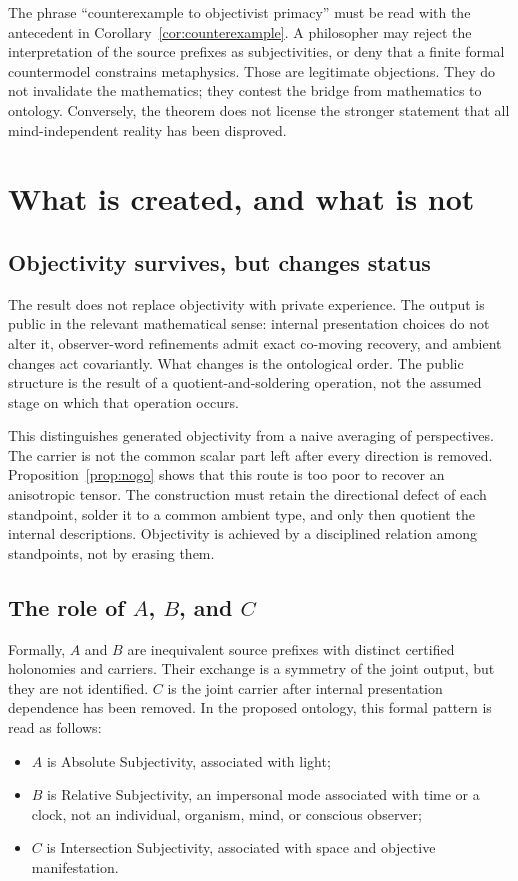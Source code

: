 \documentclass[11pt]{article}
\theoremstyle{definition}
\theoremstyle{remark}
\begin{document}
The phrase ``counterexample to objectivist primacy'' must be read with the antecedent in Corollary~\ref{cor:counterexample}. A philosopher may reject the interpretation of the source prefixes as subjectivities, or deny that a finite formal countermodel constrains metaphysics. Those are legitimate objections. They do not invalidate the mathematics; they contest the bridge from mathematics to ontology. Conversely, the theorem does not license the stronger statement that all mind-independent reality has been disproved.

\section{What is created, and what is not}

\subsection{Objectivity survives, but changes status}

The result does not replace objectivity with private experience. The output is public in the relevant mathematical sense: internal presentation choices do not alter it, observer-word refinements admit exact co-moving recovery, and ambient changes act covariantly. What changes is the ontological order. The public structure is the result of a quotient-and-soldering operation, not the assumed stage on which that operation occurs.

This distinguishes generated objectivity from a naive averaging of perspectives. The carrier is not the common scalar part left after every direction is removed. Proposition~\ref{prop:nogo} shows that this route is too poor to recover an anisotropic tensor. The construction must retain the directional defect of each standpoint, solder it to a common ambient type, and only then quotient the internal descriptions. Objectivity is achieved by a disciplined relation among standpoints, not by erasing them.

\subsection{The role of \texorpdfstring{$A$, $B$, and $C$}{A, B, and C}}

Formally, $A$ and $B$ are inequivalent source prefixes with distinct certified holonomies and carriers. Their exchange is a symmetry of the joint output, but they are not identified. $C$ is the joint carrier after internal presentation dependence has been removed. In the proposed ontology, this formal pattern is read as follows:
\begin{itemize}
\item $A$ is Absolute Subjectivity, associated with light;
\item $B$ is Relative Subjectivity, an impersonal mode associated with time or a clock, not an individual, organism, mind, or conscious observer;
\item $C$ is Intersection Subjectivity, associated with space and objective manifestation.
\end{itemize}
\end{document}
